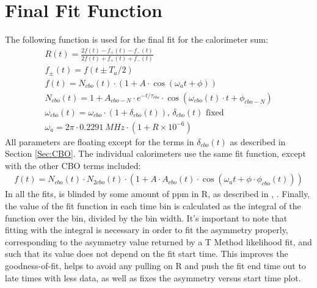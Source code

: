\clearpage

\section{Final Fit Function}
\label{Sec:FinalFitFunction}

	The following function is used for the final fit for the calorimeter sum:
	\begin{gather}
		R(t) = \frac{2f(t) - f_{+}(t) - f_{-}(t)}{2f(t) + f_{+}(t) + f_{-}(t)} \\[6pt]
		f_{\pm}(t) = f(t \pm T_{a}/2) \\[6pt]
		f(t) = N_{cbo}(t) \cdot (1 + A \cdot \cos(\omega_{a}t + \phi)) \\[6pt]
		N_{cbo}(t) = 1 + A_{cbo-N} \cdot e^{-t/\tau_{cbo}} \cdot \cos(\omega_{cbo}(t) \cdot t + \phi_{cbo-N}) \\[6pt]
		\omega_{cbo}(t) = \omega_{cbo} \cdot (1 + \delta_{cbo}(t)) \text{, $\delta_{cbo}(t)$ fixed} \\[6pt]
		\omega_{a} = 2 \pi \cdot \SI{0.2291}{MHz} \cdot (1 + R \times 10^{-6})
	\end{gather}
	All parameters are floating except for the terms in $\delta_{cbo}(t)$ as described in Section \ref{Sec:CBO}. The individual calorimeters use the same fit function, except with the other CBO terms included:
	\begin{gather}
			f(t) = N_{cbo}(t) \cdot N_{2cbo}(t) \cdot (1 + A \cdot A_{cbo}(t) \cdot \cos(\omega_{a}t + \phi \cdot \phi_{cbo}(t)))
	\end{gather}
	In all the fits, \wa is blinded by some amount of ppm in R, as described in , \cite{SoftwareBlinding}. Finally, the value of the fit function in each time bin is calculated as the integral of the function over the bin, divided by the bin width. It's important to note that fitting with the integral is necessary in order to fit the asymmetry properly, corresponding to the asymmetry value returned by a T Method likelihood fit, and such that its value does not depend on the fit start time. This improves the goodness-of-fit, helps to avoid any pulling on R and push the fit end time out to late times with less data, as well as fixes the asymmetry versus start time plot.
